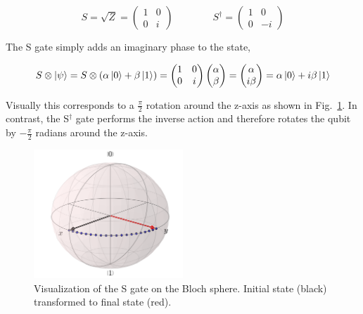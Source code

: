 \begin{equation}
S = \sqrt{Z} = \begin{pmatrix}
 1 & 0 \\ 
 0 & i
 \end{pmatrix}
 \quad \quad \quad \quad
S^\dagger = \begin{pmatrix}
 1 & 0 \\ 
 0 & -i
 \end{pmatrix}
\end{equation}

The S gate simply adds an imaginary phase to the \1 state,

\begin{equation}
\label{equ:sverification}
S \otimes \ket{\psi} = S \otimes (\alpha \ket{0} + \beta \ket{1}) = \begin{pmatrix}
 1 & 0 \\ 
 0 & i
 \end{pmatrix} \begin{pmatrix}
 \alpha  \\ 
 \beta
 \end{pmatrix} = \begin{pmatrix}
 \alpha  \\ 
 i\beta
 \end{pmatrix} = \alpha \ket{0} + i\beta \ket{1}
\end{equation}

Visually this corresponds to a $\frac{\pi}{2}$ rotation around the z-axis as shown in Fig.~\ref{img:blochsgate}. In contrast, the S$^\dagger$ gate performs the inverse action and therefore rotates the qubit by $-\frac{\pi}{2}$ radians around the z-axis.

\begin{figure}[ht]
   \centering
   \includegraphics[width=0.5\textwidth]{img/blochsgate.png}
   \caption{Visualization of the S gate on the Bloch sphere. Initial state (black) transformed to final state (red).}
   \label{img:blochsgate}
\end{figure}

